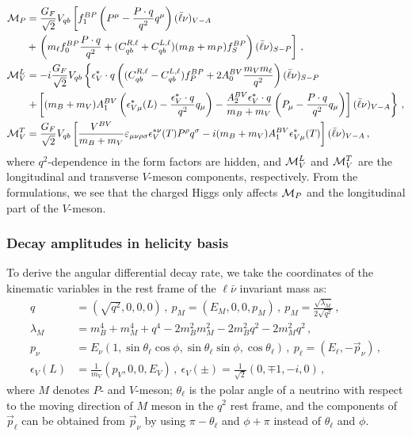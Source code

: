 \documentclass[prd,preprint,superscriptaddress,amsmath,amssymb]{revtex4}
\begin{document}
 \begin{align}
 {\cal M}_P &= \frac{G_F}{\sqrt{2}} V_{qb} \left[f^{BP}_1 \left(P^\mu -\frac{P\cdot q}{q^2}q^\mu \right) (\bar\ell \nu)_{V-A} \right. \nonumber \\
 &+ \left. \left( m_\ell f^{BP}_0 \frac{P\cdot q}{q^2} + (C^{R,\ell}_{qb} + C^{L,\ell}_{qb})(m_B + m_P) f^{BP}_S  \right) (\bar\ell \nu)_{S-P}\right]\,, \label{eq:MP} \\
%
{\cal M}^L_{V}&= -i \frac{G_F}{\sqrt{2}} V_{qb} \left\{\epsilon^*_V\cdot q \left( (C^{R,\ell}_{qb} -C^{L,\ell}_{qb} ) f^{BP}_P + 2 A^{BV}_0 \frac{m_{V} m_\ell}{q^2}\right) (\bar\ell \nu)_{S-P} \right. \nonumber \\
& \left. + \left[ (m_B + m_{V}) A^{BV}_1 \left( \epsilon^*_{V\mu}(L) - \frac{\epsilon^*_V \cdot q}{q^2} q_\mu\right) - \frac{A^{BV}_2 \epsilon^*_V \cdot q}{m_B + m_V}  \left(P_\mu -\frac{P\cdot q}{q^2}q_\mu \right)\right] (\bar\ell \nu)_{V-A}\right\}\,, \nonumber \\
%
{\cal M}^{T}_{V} &=  \frac{G_F}{\sqrt{2}} V_{qb} \left[ \frac{V^{BV}}{m_B + m_{V}} \varepsilon_{\mu\nu\rho \sigma} \epsilon^{*\nu}_{V}(T) P^\rho q^\sigma - i (m_B + m_{V})A^{BV}_1 \epsilon^*_{V\mu}(T)
\right] (\bar \ell \nu)_{V-A}\,, \label{eq:amps}
 \end{align}
where  $q^2$-dependence in the  form factors are hidden, and  ${\cal M}^L_{V}$ and ${\cal M}^T_{V}$ are the longitudinal and transverse $V$-meson components, respectively. From the formulations, we see that  the charged Higgs only affects ${\cal M}_{P}$ and the longitudinal part of the $V$-meson. 

\subsubsection{ Decay amplitudes in helicity basis}

To derive the angular differential decay rate,  we take the coordinates of  the kinematic variables in the rest frame of the $\ell \bar\nu$ invariant mass as:
 \begin{align}
q &=(\sqrt{q^2}, 0 , 0, 0)\,,~ p_{M} = ( E_{M}, 0, 0, p_M)\,,~ p_{M} = \frac{\sqrt{\lambda_M}}{2\sqrt{q^2}} \,,  \nonumber \\  
\lambda_M & = m^4_B + m^4_M + q^4 -2 m^2_B m^2_M -2 m^2_B q^2 -2 m^2_M q^2\,, \nonumber \\
p_{\nu}  &=E_\nu(1,  \sin\theta_\ell \cos\phi,  \sin\theta_\ell \sin\phi,  \cos\theta_\ell)\,,~p_{\ell} = (E_\ell , - \vec{p}_{\nu})\,, \nonumber \\
\epsilon_V(L)&=\frac{1}{m_{V}}( p_{V},0,0, E_{V})\,,~\epsilon_V(\pm) = \frac{1}{\sqrt{2}} (0, \mp 1, - i,0)\,,
 \end{align}
where $M$ denotes $P$- and $V$-meson; $\theta_\ell$ is the polar angle of a neutrino with respect to the moving direction of $M$ meson in the $q^2$ rest frame, and the components of $\vec{p}_{\ell}$ can be obtained from $\vec{p}_{\nu}$ by using  $\pi-\theta_\ell$ and $\phi + \pi$ instead of $\theta_\ell$ and $\phi$. 
\end{document}
